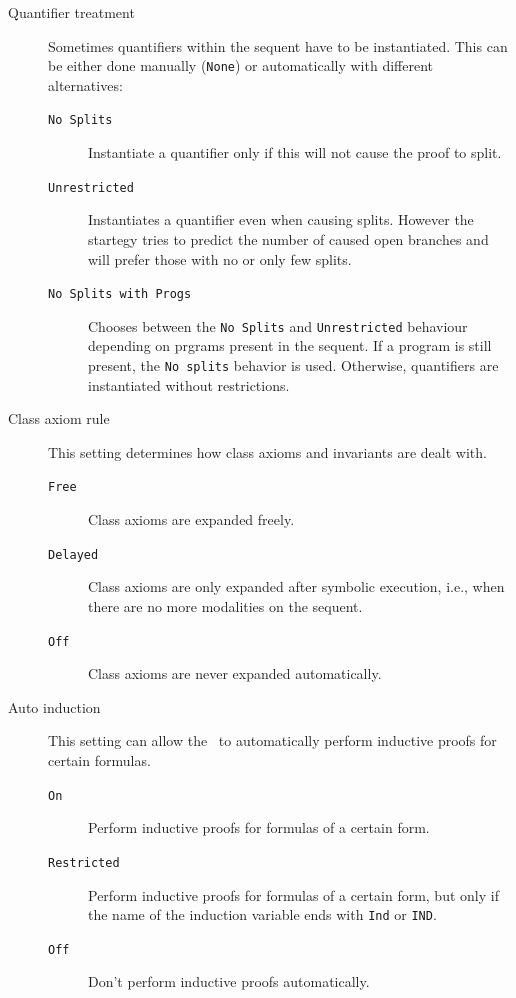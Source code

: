 \begin{description}
   
   \item[Quantifier treatment] Sometimes quantifiers within the
      sequent have to be instantiated. This can be either done
      manually (\texttt{None}) or automatically with different
      alternatives:
      \begin{description}
        \item[\texttt{No Splits}] Instantiate a quantifier only if
          this will not cause the proof to split.
        \item[\texttt{Unrestricted}] Instantiates a quantifier even
          when causing splits. However the startegy tries to predict
          the number of caused open branches and will prefer those
          with no or only few splits.
        \item[\texttt{No Splits with Progs}] Chooses between the
          \texttt{No Splits} and \texttt{Unrestricted} behaviour
          depending on prgrams present in the sequent. If a program is
          still present, the \texttt{No splits} behavior is
          used. Otherwise, quantifiers are instantiated without restrictions.
      \end{description}
  
     \item[Class axiom rule] This setting determines how class axioms and invariants are dealt with.
     \begin{description}
     	\item[\texttt{Free}] Class axioms are expanded freely.
     	\item[\texttt{Delayed}] Class axioms are only expanded after symbolic execution, i.e., when there are no more modalities on the sequent.
     	\item[\texttt{Off}] Class axioms are never expanded automatically.
     \end{description}
 
     \item[Auto induction] This setting can allow the \kp\ to automatically perform inductive proofs for certain formulas.
     \begin{description}
     \item[\texttt{On}] Perform inductive proofs for formulas of a certain form.
     \item[\texttt{Restricted}] Perform inductive proofs for formulas of a certain form, but only if the name of the induction variable ends with \texttt{Ind} or \texttt{IND}.
     \item[\texttt{Off}] Don't perform inductive proofs automatically.
     \end{description}
       
    \end{description}   


